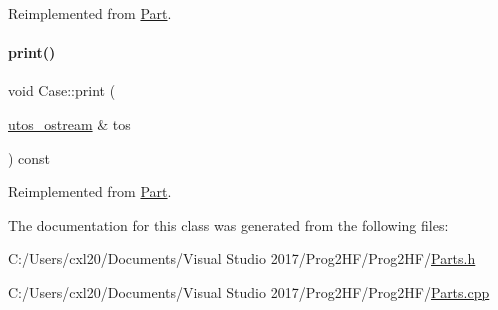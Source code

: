 Reimplemented from \mbox{\hyperlink{class_part_a4fa402b8e8fd4236ff773a7697ab2bc3}{Part}}.

\mbox{\label{class_case_ae179519844b825815f4accddafae13b6}} 
\paragraph{\texorpdfstring{print()}{print()}\hspace{0.1cm}{\footnotesize\ttfamily [2/2]}}
{\footnotesize\ttfamily void Case\+::print (\begin{DoxyParamCaption}\item[{\mbox{\hyperlink{structutos__ostream}{utos\+\_\+ostream}} \&}]{tos }\end{DoxyParamCaption}) const\hspace{0.3cm}{\ttfamily [virtual]}}



Reimplemented from \mbox{\hyperlink{class_part_a9ecabe44ba3415badf82c6a23617a41e}{Part}}.



The documentation for this class was generated from the following files\+:\begin{DoxyCompactItemize}
\item 
C\+:/\+Users/cxl20/\+Documents/\+Visual Studio 2017/\+Prog2\+H\+F/\+Prog2\+H\+F/\mbox{\hyperlink{_parts_8h}{Parts.\+h}}\item 
C\+:/\+Users/cxl20/\+Documents/\+Visual Studio 2017/\+Prog2\+H\+F/\+Prog2\+H\+F/\mbox{\hyperlink{_parts_8cpp}{Parts.\+cpp}}\end{DoxyCompactItemize}
